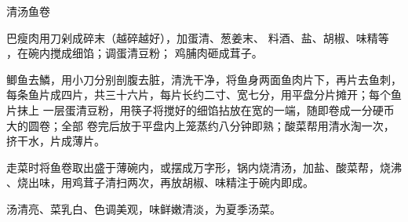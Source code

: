 \begin{recipe}{清汤鱼卷}

\ingredients


\preparation

\step 巴瘦肉用刀剁成碎末（越碎越好），加蛋清、葱姜末、 料酒、盐、胡椒、味精等
，在碗内搅成细馅；调蛋清豆粉； 鸡脯肉砸成茸子。

\step 鲫鱼去鱗，用小刀分别剖腹去脏，清洗干净，将鱼身两面鱼肉片下，再片去鱼刺，
每条鱼片成四片，共三十六片，每片长约二寸、宽七分，用平盘分片摊开；每个鱼片抹上
一层蛋清豆粉，用筷子将搅好的细馅拈放在宽的一端，随即卷成一分硬币大的圆卷；全部
卷完后放于平盘内上笼蒸约八分钟即熟；酸菜帮用清水淘一次，挤干水，片成薄片。

\step 走菜时将鱼卷取出盛于薄碗内，或摆成万字形，锅内烧清汤，加盐、酸菜帮，烧沸
、烧出味，用鸡茸子清扫两次，再放胡椒、味精注于碗内即成。

\features

汤清亮、菜乳白、色调美观，味鲜嫩清淡，为夏季汤菜。

\end{recipe}

